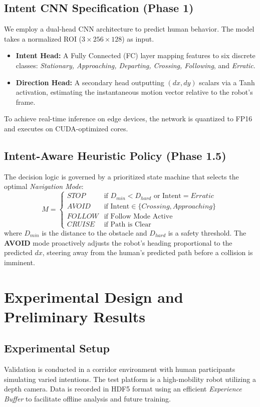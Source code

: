 \documentclass[conference]{IEEEtran}
\begin{document}
\subsection{Intent CNN Specification (Phase 1)}
We employ a dual-head CNN architecture to predict human behavior. The model takes a normalized ROI ($3 \times 256 \times 128$) as input.
\begin{itemize}
    \item \textbf{Intent Head:} A Fully Connected (FC) layer mapping features to six discrete classes: \textit{Stationary, Approaching, Departing, Crossing, Following}, and \textit{Erratic}.
    \item \textbf{Direction Head:} A secondary head outputting $(dx, dy)$ scalars via a Tanh activation, estimating the instantaneous motion vector relative to the robot's frame.
\end{itemize}
To achieve real-time inference on edge devices, the network is quantized to FP16 and executes on CUDA-optimized cores.

\subsection{Intent-Aware Heuristic Policy (Phase 1.5)}
The decision logic is governed by a prioritized state machine that selects the optimal \textit{Navigation Mode}:
\begin{equation}
M = 
\begin{cases} 
STOP & \text{if } D_{min} < D_{hard} \text{ or Intent} = Erratic \\
AVOID & \text{if Intent} \in \{Crossing, Approaching\} \\
FOLLOW & \text{if Follow Mode Active} \\
CRUISE & \text{if Path is Clear}
\end{cases}
\end{equation}
where $D_{min}$ is the distance to the obstacle and $D_{hard}$ is a safety threshold. The \textbf{AVOID} mode proactively adjusts the robot's heading proportional to the predicted $dx$, steering away from the human's predicted path before a collision is imminent.

\section{Experimental Design and Preliminary Results}
\subsection{Experimental Setup}
Validation is conducted in a corridor environment with human participants simulating varied intentions. The test platform is a high-mobility robot utilizing a depth camera. Data is recorded in HDF5 format using an efficient \textit{Experience Buffer} to facilitate offline analysis and future training.
\end{document}
